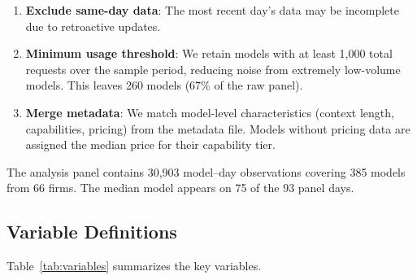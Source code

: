 \documentclass[11pt, a4paper]{article}
\begin{document}
\begin{enumerate}[nosep]
\item \textbf{Exclude same-day data}: The most recent day's data may be incomplete due to retroactive updates.
\item \textbf{Minimum usage threshold}: We retain models with at least 1,000 total requests over the sample period, reducing noise from extremely low-volume models. This leaves 260 models (67\% of the raw panel).
\item \textbf{Merge metadata}: We match model-level characteristics (context length, capabilities, pricing) from the metadata file. Models without pricing data are assigned the median price for their capability tier.
\end{enumerate}

The analysis panel contains 30,903 model--day observations covering 385 models from 66 firms. The median model appears on 75 of the 93 panel days.

\subsection{Variable Definitions}

Table~\ref{tab:variables} summarizes the key variables.
\end{document}
